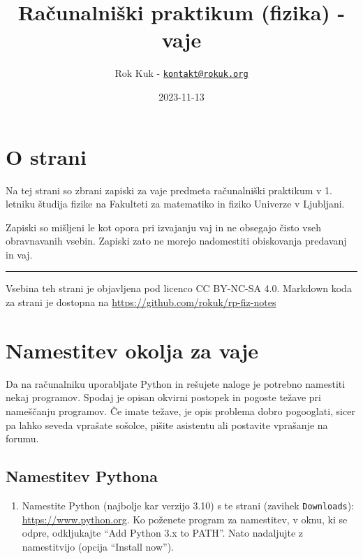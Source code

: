 \documentclass[
]{report}
\title{Računalniški praktikum (fizika) - vaje}
\author{Rok Kuk - \href{mailto:kontakt@rokuk.org}{\nolinkurl{kontakt@rokuk.org}}}
\date{2023-11-13}
\providecommand{\tightlist}{%
  \setlength{\itemsep}{0pt}\setlength{\parskip}{0pt}}
\begin{document}
\maketitle

{
\setcounter{tocdepth}{1}
\tableofcontents
}
\hypertarget{o-strani}{%
\chapter*{O strani}\label{o-strani}}

Na tej strani so zbrani zapiski za vaje predmeta računalniški praktikum v 1. letniku študija fizike na Fakulteti za matematiko in fiziko Univerze v Ljubljani.

Zapiski so mišljeni le kot opora pri izvajanju vaj in ne obsegajo čisto vseh obravnavanih vsebin. Zapiski zato ne morejo nadomestiti obiskovanja predavanj in vaj.

\begin{center}\rule{0.5\linewidth}{0.5pt}\end{center}

Vsebina teh strani je objavljena pod licenco CC BY-NC-SA 4.0.
Markdown koda za strani je dostopna na \url{https://github.com/rokuk/rp-fiz-notes}

\hypertarget{namestitev-okolja-za-vaje}{%
\chapter{Namestitev okolja za vaje}\label{namestitev-okolja-za-vaje}}

Da na računalniku uporabljate Python in rešujete naloge je potrebno namestiti
nekaj programov. Spodaj je opisan okvirni postopek in pogoste težave pri nameščanju
programov. Če imate težave, je opis problema dobro pogooglati, sicer pa lahko seveda vprašate sošolce, pišite
asistentu ali postavite vprašanje na forumu.

\hypertarget{namestitev-pythona}{%
\section{Namestitev Pythona}\label{namestitev-pythona}}

\begin{enumerate}
\def\labelenumi{\arabic{enumi}.}
\tightlist
\item
  Namestite Python (najbolje kar verzijo 3.10) s te strani (zavihek \texttt{Downloads}): \url{https://www.python.org}. Ko poženete program za namestitev, v oknu, ki se odpre, odkljukajte ``Add Python 3.x to PATH''. Nato nadaljujte z namestitvijo (opcija ``Install now'').
\end{enumerate}
\end{document}
